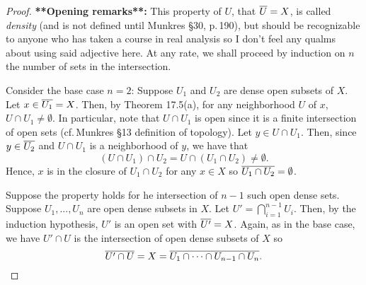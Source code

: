 \begin{proof}
\textbf{**Opening remarks**:} This property of $U$, that
$\overline{U}=X$, is called \emph{density} (and is not defined until
Munkres \S30, p.\,190), but should be recognizable to anyone who
has taken a course in real analysis so I don't feel any qualms
about using said adjective here. At any rate, we shall proceed by
induction on $n$ the number of sets in the intersection.

Consider the base case $n=2$: Suppose $U_1$ and $U_2$ are dense
open subsets of $X$. Let $x\in\overline{U_1}=X$. Then, by Theorem
17.5(a), for any neighborhood $U$ of $x$, $U\cap
U_1\neq\emptyset$. In particular, note that $U\cap U_1$ is
open since it is a finite intersection of open sets (cf.\,Munkres
\S13 definition of topology). Let $y\in U\cap U_1$. Then, since
$y\in\overline{U_2}$ and $U\cap U_1$ is a neighborhood of $y$, we
have that
\[
(U\cap U_1)\cap U_2=U\cap (U_1\cap U_2)\neq\emptyset.
\]
Hence, $x$ is in the closure of $U_1\cap U_2$ for any $x\in X$ so
$\overline{U_1\cap U_2}=\emptyset$.

Suppose the property holds for he intersection of $n-1$ such open
dense sets. Suppose $U_1,...,U_n$ are open dense subsets in $X$. Let
$U'=\bigcap_{i=1}^{n-1}U_i$. Then, by the induction hypothesis,
$U'$ is an open set with $\overline{U'}=X$. Again, as in the base
case, we have $U'\cap U$ is the intersection of open dense
subsets of $X$ so
\[
\overline{U'\cap U}=X=\overline{U_1\cap\cdots\cap U_{n-1}\cap U_n}.\qedhere
\]
\end{proof}

